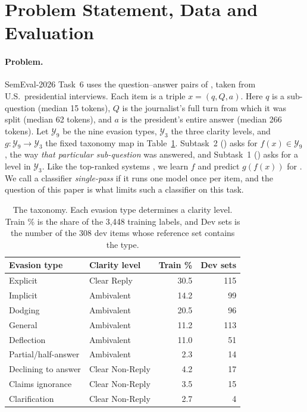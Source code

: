 \section{Problem Statement, Data and Evaluation}
\label{sec:task}

\paragraph{Problem.}
SemEval-2026 Task~6 \citep{thomas-etal-2026-semeval} uses the question--answer pairs of \citet{thomas-etal-2024-never}, taken from U.S.\ presidential interviews.
Each item is a triple $x = (q, Q, a)$.
Here $q$ is a sub-question (median 15 tokens), $Q$ is the journalist's full turn from which it was split (median 62 tokens), and $a$ is the president's entire answer (median 266 tokens).
Let $\mathcal{Y}_9$ be the nine evasion types, $\mathcal{Y}_3$ the three clarity levels, and $g:\mathcal{Y}_9 \rightarrow \mathcal{Y}_3$ the fixed taxonomy map in Table~\ref{tab:taxonomy}.
Subtask~2 (\Stwo{}) asks for $f(x) \in \mathcal{Y}_9$, the way \emph{that particular sub-question} was answered, and Subtask~1 (\Sone{}) asks for a level in $\mathcal{Y}_3$.
Like the top-ranked systems \citep{shi-etal-2026-teleai,peerachaidecho-rutherford-2026-chulanlp}, we learn $f$ and predict $g(f(x))$ for \Sone{}.
We call a classifier \emph{single-pass} if it runs one model once per item, and the question of this paper is what limits such a classifier on this task.

\begin{table}[t]
\centering
\small
\setlength{\tabcolsep}{3.5pt}
\begin{tabular}{@{}llrr@{}}
\toprule
Evasion type & Clarity level & Train \% & Dev sets \\
\midrule
Explicit            & Clear Reply     & 30.5 & 115 \\
\midrule
Implicit            & Ambivalent      & 14.2 & 99 \\
Dodging             & Ambivalent      & 20.5 & 96 \\
General             & Ambivalent      & 11.2 & 113 \\
Deflection          & Ambivalent      & 11.0 & 51 \\
Partial/half-answer & Ambivalent      & 2.3  & 14 \\
\midrule
Declining to answer & Clear Non-Reply & 4.2  & 17 \\
Claims ignorance    & Clear Non-Reply & 3.5  & 15 \\
Clarification       & Clear Non-Reply & 2.7  & 4 \\
\bottomrule
\end{tabular}
\caption{The taxonomy. Each evasion type determines a clarity level. Train \% is the share of the 3,448 training labels, and Dev sets is the number of the 308 dev items whose reference set contains the type.}
\label{tab:taxonomy}
\end{table}

